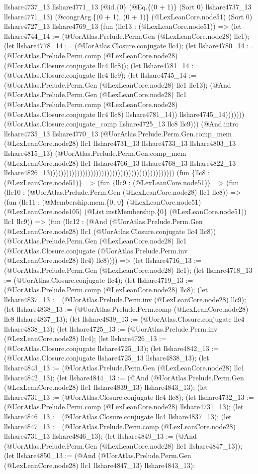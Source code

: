 \documentclass[11pt]{article}
\begin{document}
llshare4737\_13 llshare4771\_13 (@id.\{0\} (@Eq.\{(0 + 1)\} (Sort 0) llshare4737\_13 llshare4771\_13) (@congrArg.\{(0 + 1), (0 + 1)\} (@LexLeanCore.node51) (Sort 0) llshare4727\_13 llshare4769\_13 (fun (llc13 : (@LexLeanCore.node51)) => (let llshare4744\_14 := (@UorAtlas.Prelude.Perm.Gen (@LexLeanCore.node28) llc1); (let llshare4778\_14 := (@UorAtlas.Closure.conjugate llc4); (let llshare4780\_14 := (@UorAtlas.Prelude.Perm.comp (@LexLeanCore.node28) (@UorAtlas.Closure.conjugate llc4 llc8)); (let llshare4781\_14 := (@UorAtlas.Closure.conjugate llc4 llc9); (let llshare4745\_14 := (@UorAtlas.Prelude.Perm.Gen (@LexLeanCore.node28) llc1 llc13); (@And (@UorAtlas.Prelude.Perm.Gen (@LexLeanCore.node28) llc1 (@UorAtlas.Prelude.Perm.comp (@LexLeanCore.node28) (@UorAtlas.Closure.conjugate llc4 llc8) llshare4781\_14)) llshare4745\_14))))))) (@UorAtlas.Closure.conjugate\_comp llshare4725\_13 llc8 llc9))) (@And.intro llshare4735\_13 llshare4770\_13 (@UorAtlas.Prelude.Perm.Gen.comp\_mem (@LexLeanCore.node28) llc1 llshare4731\_13 llshare4733\_13 llshare4803\_13 llshare4815\_13) (@UorAtlas.Prelude.Perm.Gen.comp\_mem (@LexLeanCore.node28) llc1 llshare4766\_13 llshare4768\_13 llshare4822\_13 llshare4826\_13)))))))))))))))))))))))))))))))))))))))))))))) (fun \{llc8 : (@LexLeanCore.node51)\} => (fun \{llc9 : (@LexLeanCore.node51)\} => (fun (llc10 : (@UorAtlas.Prelude.Perm.Gen (@LexLeanCore.node28) llc1 llc8)) => (fun (llc11 : (@Membership.mem.\{0, 0\} (@LexLeanCore.node51) (@LexLeanCore.node105) (@List.instMembership.\{0\} (@LexLeanCore.node51)) llc1 llc9)) => (fun (llc12 : (@And (@UorAtlas.Prelude.Perm.Gen (@LexLeanCore.node28) llc1 (@UorAtlas.Closure.conjugate llc4 llc8)) (@UorAtlas.Prelude.Perm.Gen (@LexLeanCore.node28) llc1 (@UorAtlas.Closure.conjugate (@UorAtlas.Prelude.Perm.inv (@LexLeanCore.node28) llc4) llc8)))) => (let llshare4716\_13 := (@UorAtlas.Prelude.Perm.Gen (@LexLeanCore.node28) llc1); (let llshare4718\_13 := (@UorAtlas.Closure.conjugate llc4); (let llshare4719\_13 := (@UorAtlas.Prelude.Perm.comp (@LexLeanCore.node28) llc8); (let llshare4837\_13 := (@UorAtlas.Prelude.Perm.inv (@LexLeanCore.node28) llc9); (let llshare4838\_13 := (@UorAtlas.Prelude.Perm.comp (@LexLeanCore.node28) llc8 llshare4837\_13); (let llshare4839\_13 := (@UorAtlas.Closure.conjugate llc4 llshare4838\_13); (let llshare4725\_13 := (@UorAtlas.Prelude.Perm.inv (@LexLeanCore.node28) llc4); (let llshare4726\_13 := (@UorAtlas.Closure.conjugate llshare4725\_13); (let llshare4842\_13 := (@UorAtlas.Closure.conjugate llshare4725\_13 llshare4838\_13); (let llshare4843\_13 := (@UorAtlas.Prelude.Perm.Gen (@LexLeanCore.node28) llc1 llshare4842\_13); (let llshare4844\_13 := (@And (@UorAtlas.Prelude.Perm.Gen (@LexLeanCore.node28) llc1 llshare4839\_13) llshare4843\_13); (let llshare4731\_13 := (@UorAtlas.Closure.conjugate llc4 llc8); (let llshare4732\_13 := (@UorAtlas.Prelude.Perm.comp (@LexLeanCore.node28) llshare4731\_13); (let llshare4846\_13 := (@UorAtlas.Closure.conjugate llc4 llshare4837\_13); (let llshare4847\_13 := (@UorAtlas.Prelude.Perm.comp (@LexLeanCore.node28) llshare4731\_13 llshare4846\_13); (let llshare4849\_13 := (@And (@UorAtlas.Prelude.Perm.Gen (@LexLeanCore.node28) llc1 llshare4847\_13)); (let llshare4850\_13 := (@And (@UorAtlas.Prelude.Perm.Gen (@LexLeanCore.node28) llc1 llshare4847\_13) llshare4843\_13); 
\end{document}

